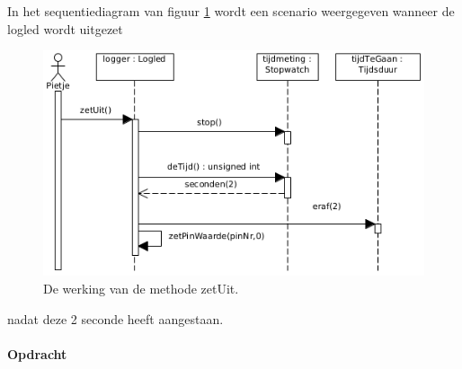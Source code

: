 \begin{itemize}
\begin{itemize}
 \end{itemize} 
 In het sequentiediagram van figuur \ref{fig:ll_zetUit} wordt een scenario weergegeven wanneer de logled wordt uitgezet
  \begin{figure}[h!]
	\captionsetup{justification=centering}
	\includegraphics[width=0.8 \linewidth]{figuren/seqZetUit}      %
\centering
\caption{De werking van de methode zetUit.}
\label{fig:ll_zetUit}
\end{figure} 
nadat deze 2 seconde heeft aangestaan.
\end{itemize}
\paragraph{Opdracht}

